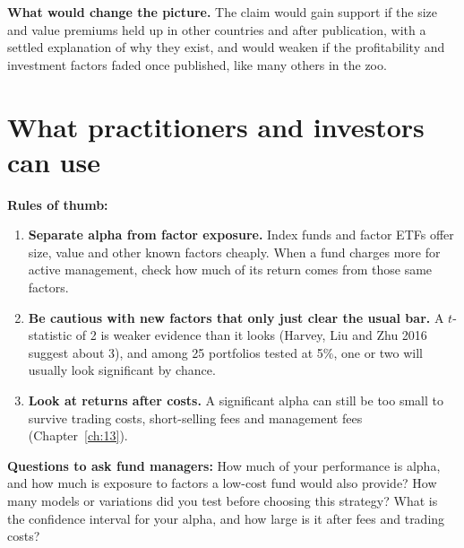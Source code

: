 \textbf{What would change the picture.} The claim would gain support if the size and value premiums held up in other countries and after publication, with a settled explanation of why they exist, and would weaken if the profitability and investment factors faded once published, like many others in the zoo.

\section{What practitioners and investors can use}
\label{sec:04-investors}

\textbf{Rules of thumb:}
\begin{enumerate}
  \item \textbf{Separate alpha from factor exposure.} Index funds and factor ETFs offer size, value and other known factors cheaply. When a fund charges more for active management, check how much of its return comes from those same factors.
  \item \textbf{Be cautious with new factors that only just clear the usual bar.} A $t$-statistic of 2 is weaker evidence than it looks (Harvey, Liu and Zhu 2016 suggest about 3), and among 25 portfolios tested at 5\%, one or two will usually look significant by chance.
  \item \textbf{Look at returns after costs.} A significant alpha can still be too small to survive trading costs, short-selling fees and management fees (Chapter~\ref{ch:13}).
\end{enumerate}

\textbf{Questions to ask fund managers:} How much of your performance is alpha, and how much is exposure to factors a low-cost fund would also provide? How many models or variations did you test before choosing this strategy? What is the confidence interval for your alpha, and how large is it after fees and trading costs?
